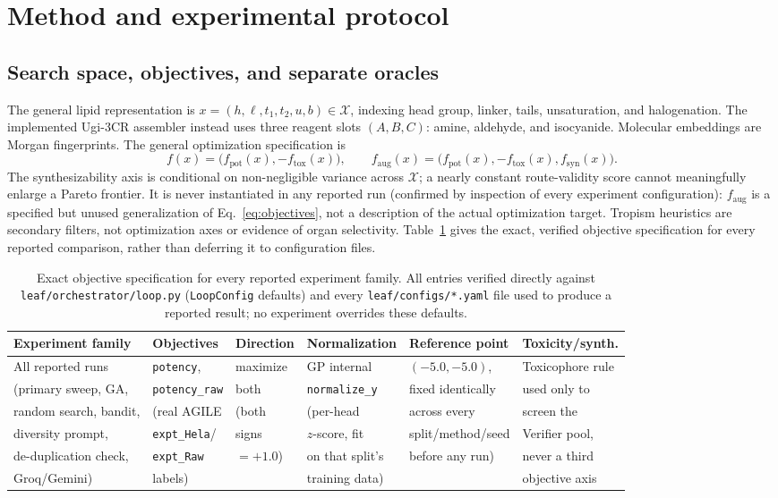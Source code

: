 \documentclass{article}
\begin{document}
\section{Method and experimental protocol}
\label{sec:method}
\subsection{Search space, objectives, and separate oracles}
The general lipid representation is $x=(h,\ell,t_1,t_2,u,b)\in\mathcal X$, indexing head group, linker, tails, unsaturation, and halogenation. The implemented Ugi-3CR assembler instead uses three reagent slots $(A,B,C)$: amine, aldehyde, and isocyanide. Molecular embeddings are Morgan fingerprints. The general optimization specification is
\begin{equation}
 f(x)=\bigl(f_{\mathrm{pot}}(x),-f_{\mathrm{tox}}(x)\bigr),\qquad
 f_{\mathrm{aug}}(x)=\bigl(f_{\mathrm{pot}}(x),-f_{\mathrm{tox}}(x),f_{\mathrm{syn}}(x)\bigr).
 \label{eq:objectives}
\end{equation}
The synthesizability axis is conditional on non-negligible variance across $\mathcal X$; a nearly constant route-validity score cannot meaningfully enlarge a Pareto frontier. It is never instantiated in any reported run (confirmed by inspection of every experiment configuration): $f_{\mathrm{aug}}$ is a specified but unused generalization of Eq.~\ref{eq:objectives}, not a description of the actual optimization target. Tropism heuristics are secondary filters, not optimization axes or evidence of organ selectivity. Table~\ref{tab:objectives} gives the exact, verified objective specification for every reported comparison, rather than deferring it to configuration files.

\begin{table}[t]
\caption{Exact objective specification for every reported experiment family. All entries verified directly against \texttt{leaf/orchestrator/loop.py} (\texttt{LoopConfig} defaults) and every \texttt{leaf/configs/*.yaml} file used to produce a reported result; no experiment overrides these defaults.}
\label{tab:objectives}
\centering
\begin{tabular}{@{}llllll@{}}
\toprule
Experiment family & Objectives & Direction & Normalization & Reference point & Toxicity/synth. \\
\midrule
All reported runs & \texttt{potency}, & maximize & GP internal & $(-5.0,-5.0)$, & Toxicophore rule \\
(primary sweep, GA, & \texttt{potency\_raw} & both & \texttt{normalize\_y} & fixed identically & used only to \\
random search, bandit, & (real AGILE & (both & (per-head & across every & screen the \\
diversity prompt, & \texttt{expt\_Hela}/ & signs & $z$-score, fit & split/method/seed & Verifier pool, \\
de-duplication check, & \texttt{expt\_Raw} & $=+1.0$) & on that split's & before any run) & never a third \\
Groq/Gemini) & labels) & & training data) & & objective axis \\
\bottomrule
\end{tabular}
\end{table}
\end{document}
